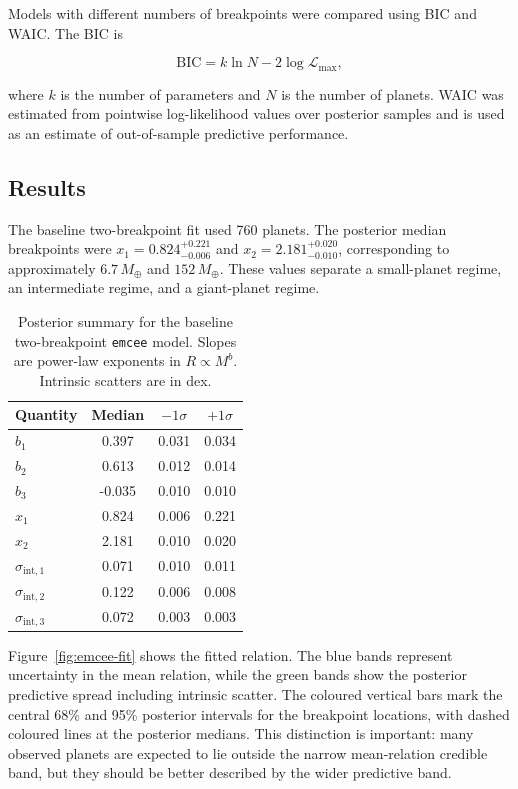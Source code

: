 \documentclass{article}
\numberwithin{equation}{section}
\begin{document}
Models with different numbers of breakpoints were compared using BIC and WAIC. The BIC is

\begin{equation}
\mathrm{BIC}
=
k\ln N
-
2\log \mathcal{L}_{\mathrm{max}},
\end{equation}

where $k$ is the number of parameters and $N$ is the number of planets. WAIC was estimated from pointwise log-likelihood values over posterior samples and is used as an estimate of out-of-sample predictive performance.

\subsection{Results}

The baseline two-breakpoint fit used 760 planets. The posterior median breakpoints were
$x_1 = 0.824^{+0.221}_{-0.006}$ and
$x_2 = 2.181^{+0.020}_{-0.010}$, corresponding to approximately
$6.7\,M_\oplus$ and $152\,M_\oplus$. These values separate a small-planet regime, an intermediate regime, and a giant-planet regime.

\begin{table}[H]
\centering
\caption{Posterior summary for the baseline two-breakpoint \texttt{emcee} model. Slopes are power-law exponents in $R\propto M^b$. Intrinsic scatters are in dex.}
\label{tab:emcee-parameters}
\begin{tabular}{lccc}
\toprule
Quantity & Median & $-1\sigma$ & $+1\sigma$ \\
\midrule
$b_1$ & 0.397 & 0.031 & 0.034 \\
$b_2$ & 0.613 & 0.012 & 0.014 \\
$b_3$ & -0.035 & 0.010 & 0.010 \\
$x_1$ & 0.824 & 0.006 & 0.221 \\
$x_2$ & 2.181 & 0.010 & 0.020 \\
$\sigma_{\mathrm{int},1}$ & 0.071 & 0.010 & 0.011 \\
$\sigma_{\mathrm{int},2}$ & 0.122 & 0.006 & 0.008 \\
$\sigma_{\mathrm{int},3}$ & 0.072 & 0.003 & 0.003 \\
\bottomrule
\end{tabular}
\end{table}

Figure~\ref{fig:emcee-fit} shows the fitted relation. The blue bands represent uncertainty in the mean relation, while the green bands show the posterior predictive spread including intrinsic scatter. The coloured vertical bars mark the central 68\% and 95\% posterior intervals for the breakpoint locations, with dashed coloured lines at the posterior medians. This distinction is important: many observed planets are expected to lie outside the narrow mean-relation credible band, but they should be better described by the wider predictive band.
\end{document}
